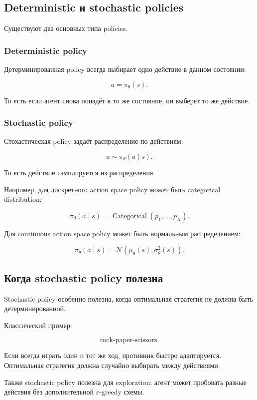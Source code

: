 \documentclass[a4paper,12pt]{article}
\begin{document}
\subsection{Deterministic и stochastic policies}

Существуют два основных типа policies.

\subsubsection{Deterministic policy}

Детерминированная policy всегда выбирает одно действие в данном состоянии:

\[
a = \pi_\theta(s).
\]

То есть если агент снова попадёт в то же состояние, он выберет то же действие.

\subsubsection{Stochastic policy}

Стохастическая policy задаёт распределение по действиям:

\[
a \sim \pi_\theta(a \mid s).
\]

То есть действие сэмплируется из распределения.

Например, для дискретного action space policy может быть categorical distribution:

\[
\pi_\theta(a \mid s)
=
\operatorname{Categorical}(p_1,\dots,p_K).
\]

Для continuous action space policy может быть нормальным распределением:

\[
\pi_\theta(a \mid s)
=
\mathcal{N}(\mu_\theta(s), \sigma_\theta^2(s)).
\]

\subsection{Когда stochastic policy полезна}

Stochastic policy особенно полезна, когда оптимальная стратегия не должна быть детерминированной.

Классический пример:

\[
\text{rock-paper-scissors}.
\]

Если всегда играть один и тот же ход, противник быстро адаптируется. Оптимальная стратегия должна случайно выбирать между действиями.

Также stochastic policy полезна для exploration: агент может пробовать разные действия без дополнительной \(\varepsilon\)-greedy схемы.
\end{document}
